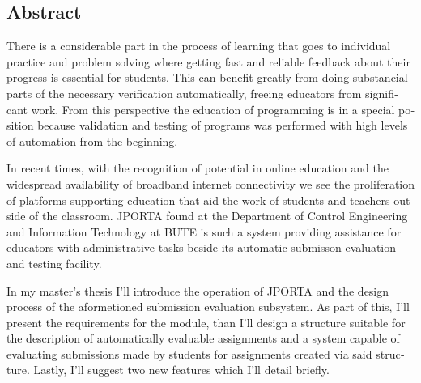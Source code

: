 \begin{otherlanguage}{english}
\chapter*{Abstract}

There is a considerable part in the process of learning that goes to individual practice and problem solving where getting fast and reliable feedback about their progress is essential for students.
This can benefit greatly from doing substancial parts of the necessary verification automatically, freeing educators from significant work.
From this perspective the education of programming is in a special position because validation and testing of programs was performed with high levels of automation from the beginning.

In recent times, with the recognition of potential in online education and the widespread availability of broadband internet connectivity we see the proliferation of platforms supporting education that aid the work of students and teachers outside of the classroom.
JPORTA found at the Department of Control Engineering and Information Technology at BUTE is such a system providing assistance for educators with administrative tasks beside its automatic submisson evaluation and testing facility.

In my master's thesis I'll introduce the operation of JPORTA and the design process of the aformetioned submission evaluation subsystem.
As part of this, I'll present the requirements for the module, than I'll design a structure suitable for the description of automatically evaluable assignments and a system capable of evaluating submissions made by students for assignments created via said structure.
Lastly, I'll suggest two new features which I'll detail briefly.
\end{otherlanguage}
\vfill

